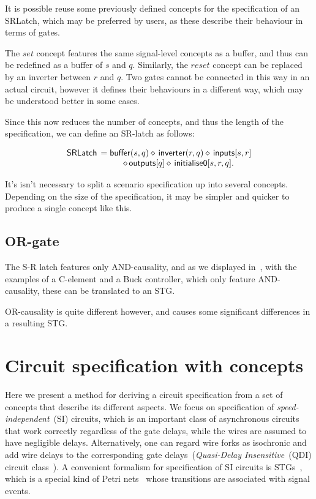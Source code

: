 \documentclass[british, journal]{IEEEtran}
\begin{document}
It is possible reuse some previously defined concepts for the specification of an SRLatch,
which may be preferred by users, as these describe their behaviour in terms of gates.  

The $set$ concept features the same signal-level concepts as a buffer, and thus can be redefined
as a buffer of $s$ and $q$. Similarly, the $reset$ concept can be replaced by an inverter between
$r$ and $q$. Two gates cannot be connected in this way in an actual circuit, however
it defines their behaviours in a different way, which may be understood better in some cases.

Since this now reduces the number of concepts, and thus the length of the specification, we
can define an SR-latch as follows:

 \[
\begin{array}{lcl}
\mathsf{SRLatch}&\hspace{-2mm}=\mathsf{buffer}(s, q) \diamond\, \mathsf{inverter}(r, q) \diamond\, \mathsf{inputs}[s, r]\\ 
&\diamond\, \mathsf{outputs}[q] \diamond\, \mathsf{initialise0} [s, r, q].
\end{array}
\]

It's isn't necessary to split a scenario specification up into several concepts. 
Depending on the size of the specification, it may be simpler and quicker to 
produce a single concept like this.

\subsection{OR-gate}

The S-R latch features only AND-causality, and as we displayed 
in~\cite{2015_Beaumont_MEMOCODE}, with the examples of a C-element 
and a Buck controller, which only feature AND-causality, these can be translated
to an STG. 

OR-causality is quite different however, and causes some significant differences 
in a resulting STG. 

\section{Circuit specification with concepts \label{sec:Circuit-specification-with}}


Here we present a method for deriving a circuit specification
from a set of concepts that describe its different aspects. We focus
on specification of \emph{speed-independent}~(SI) circuits, which
is an important class of asynchronous circuits~\cite{Muller_1959_ts}
that work correctly regardless of the gate delays, while the wires
are assumed to have negligible delays. Alternatively, one can regard
wire forks as isochronic and add wire delays to the corresponding
gate delays~(\emph{Quasi-Delay Insensitive}~(QDI) circuit
class~\cite{Martin_1986_dc}).
A convenient formalism for specification of SI circuits is
STGs~\cite{Chu_1987_phd}\cite{Rosenblum_1985_tpn},
which is a special kind of Petri nets~\cite{Petri_1962_phd} whose
transitions are associated with signal events.
\end{document}
